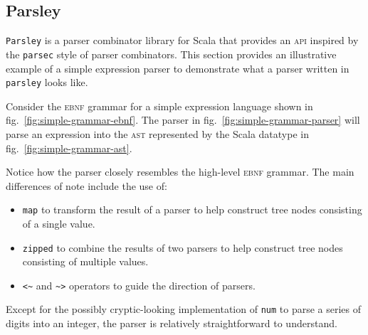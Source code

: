 \subsection{Parsley}

\texttt{Parsley} \cite{willis_garnishing_2018} is a parser combinator library for Scala that provides an \textsc{api} inspired by the \texttt{parsec} \cite{leijen_parsec_2001} style of parser combinators.
This section provides an illustrative example of a simple expression parser to demonstrate what a parser written in \texttt{parsley} looks like.

Consider the \textsc{ebnf} grammar for a simple expression language shown in fig.~\ref{fig:simple-grammar-ebnf}.
The parser in fig.~\ref{fig:simple-grammar-parser} will parse an expression into the \textsc{ast} represented by the Scala datatype in fig.~\ref{fig:simple-grammar-ast}.

Notice how the parser closely resembles the high-level \textsc{ebnf} grammar.
The main differences of note include the use of:
\begin{itemize}
  \item \texttt{map} to transform the result of a parser to help construct tree nodes consisting of a single value.
  \item \texttt{zipped} to combine the results of two parsers to help construct tree nodes consisting of multiple values.
  \item \texttt{<\textasciitilde} and \texttt{\textasciitilde>} operators to guide the direction of parsers.
\end{itemize}
Except for the possibly cryptic-looking implementation of \texttt{num} to parse a series of digits into an integer, the parser is relatively straightforward to understand.

